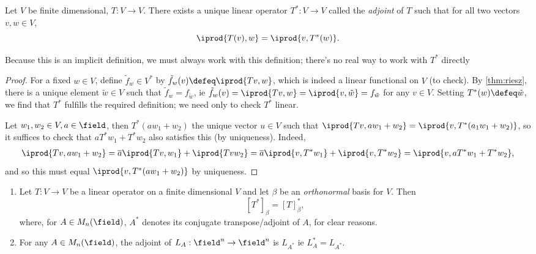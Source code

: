 \begin{theorem}[Adjoint]
    Let $V$ be finite dimensional, $T : V \to V$. There exists a unique linear operator $T^\ast : V \to V$ called the \emph{adjoint} of $T$ such that for all two vectors $v, w \in V$, \[
    \iprod{T(v), w} = \iprod{v, T^\ast(w)}.
    \]
\end{theorem}

\begin{remark}
    Because this is an implicit definition, we must always work with this definition; there's no real way to work with $T^\ast$ directly
\end{remark}

\begin{proof}
    For a fixed $w \in V$, define $\tilde{f}_w \in V^\ast$ by $\tilde{f}_w(v) \defeq \iprod{Tv, w}$, which is indeed a linear functional on $V$ (to check). By \cref{thm:riesz}, there is a unique element $\tilde{w} \in V$ such that $\tilde{f}_w = f_{\tilde{w}}$, ie $\tilde{f}_w(v) = \iprod{Tv, w} = \iprod{v, \tilde{w}} = f_{\tilde{w}}$ for any $v \in V$. Setting $T^\ast(w) \defeq \tilde{w}$, we find that $T^\ast$ fulfills the required definition; we need only to check $T^\ast$ linear.

    Let $w_1, w_2 \in V, a \in \field$, then $T^\ast(aw_1 + w_2)$ the unique vector $u \in V$ such that $\iprod{Tv, aw_1 + w_2} = \iprod{v, T^\ast(a_1 w_1 + w_2)}$, so it suffices to check that $aT^\ast w_1 + T^\ast w_2$ also satisfies this (by uniqueness). Indeed, \begin{align*}
        \iprod{Tv, aw_1 + w_2} = \overline{a} \iprod{Tv, w_1} + \iprod{Tv w_2} = \overline{a} \iprod{v, T^\ast w_1} + \iprod{v, T^\ast w_2} = \iprod{v, aT^\ast w_1 + T^\ast w_2},
    \end{align*}
    and so this must equal $\iprod{v, T^\ast (aw_1 + w_2)}$ by uniqueness.
\end{proof}

\begin{proposition}
    \begin{enumerate}[label=(\alph*)]
        \item Let $T : V \to V$ be a linear operator on a finite dimensional $V$ and let $\beta$ be an \emph{orthonormal} basis for $V$. Then \[
        [T^\ast]_\beta = [T]_\beta^\ast,    
        \]
        where, for $A \in M_n(\field)$, $A^\ast$ denotes its conjugate transpose/adjoint of $A$, for clear reasons.
    \item For any $A \in M_n(\field)$, the adjoint of $L_A : \field^n \to \field^n$ is $L_{A^\ast}$ ie $L_A^\ast = L_{A^\ast}$.
    \end{enumerate}
\end{proposition}

